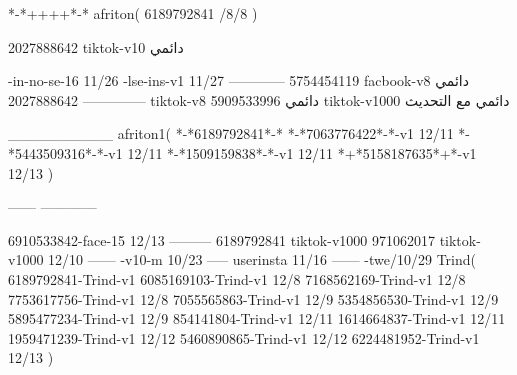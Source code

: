 *-*++++*-*
afriton(
6189792841 /8/8
)

2027888642 tiktok-v10
دائمي

-in-no-se-16 11/26
-lse-ins-v1 11/27
------------
5754454119 facbook-v8
دائمي
--------------
2027888642 tiktok-v8
دائمي
5909533996 tiktok-v1000
دائمي مع التحديث

__________
afriton1(
*-*6189792841*-*
*-*7063776422*-*-v1 12/11
*-*5443509316*-*-v1 12/11
*-*1509159838*-*-v1 12/11
*+*5158187635*+*-v1 12/13
)

------
------------


6910533842-face-15 12/13
---------
6189792841 tiktok-v1000
971062017 tiktok-v1000 12/10
------
-v10-m 10/23
-----
userinsta 11/16
------
-twe/10/29
Trind(
6189792841-Trind-v1 
6085169103-Trind-v1 12/8
7168562169-Trind-v1 12/8
7753617756-Trind-v1 12/8
7055565863-Trind-v1 12/9
5354856530-Trind-v1 12/9
5895477234-Trind-v1 12/9
854141804-Trind-v1 12/11
1614664837-Trind-v1 12/11
1959471239-Trind-v1 12/12
5460890865-Trind-v1 12/12
6224481952-Trind-v1 12/13
)
